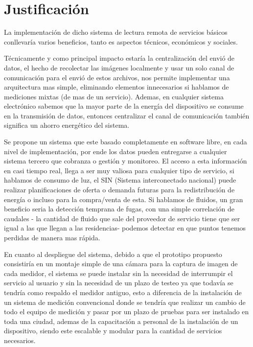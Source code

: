 

\section{Justificación}
La implementación de dicho sistema de lectura remota de servicios básicos conllevaría varios beneficios,
tanto es aspectos técnicos, económicos y sociales.

Técnicamente y como principal impacto estaría la centralización del envió de datos, el hecho de recolectar las
imágenes localmente y usar un solo canal de comunicación para el envió de estos archivos, nos permite implementar
una arquitectura mas simple, eliminando elementos innecesarios si hablamos de mediciones mixtas (de mas de un 
servicio). Ademas, en cualquier sistema electrónico sabemos que la mayor parte de la energía del dispositivo se
consume en la transmisión de datos, entonces centralizar el canal de comunicación también significa un ahorro
energético del sistema.

Se propone un sistema que este basado completamente en software libre, en cada nivel de implementación, por ende
los datos pueden entregarse a cualquier sistema tercero que cobranza o gestión y monitoreo. El acceso a esta información 
en casi tiempo real, llega a ser muy valiosa para cualquier tipo de servicio, si hablamos de consumo de luz, el SIN 
(Sistema interconectado nacional) puede realizar planificaciones de oferta o demanda futuras para la redistribución de 
energía o incluso para la compra/venta de esta. 
Si hablamos de fluidos, un gran beneficio seria la detección temprana de fugas, con una simple correlación de caudales
- la cantidad de fluido que sale del proveedor de servicio tiene que ser igual a las que llegan a las residencias-
podemos detectar en que puntos tenemos perdidas de manera mas rápida.

En cuanto al despliegue del sistema, debido a que el prototipo propuesto consistiría en un montaje simple de una cámara
para la captura de imagen de cada medidor, el sistema se puede instalar sin la necesidad de interrumpir el servicio al 
usuario y sin la necesidad de un plazo de testeo ya que todavía se tendría como respaldo el medidor antiguo, esto a 
diferencia de la instalación de un sistema de medición convencional donde se tendría que realizar un cambio de todo el
equipo de medición y pasar por un plazo de pruebas para ser instalado en toda una ciudad, ademas de la capacitación a
personal de la instalación de un dispositivo, siendo este escalable y modular para la cantidad de servicios necesarios.

